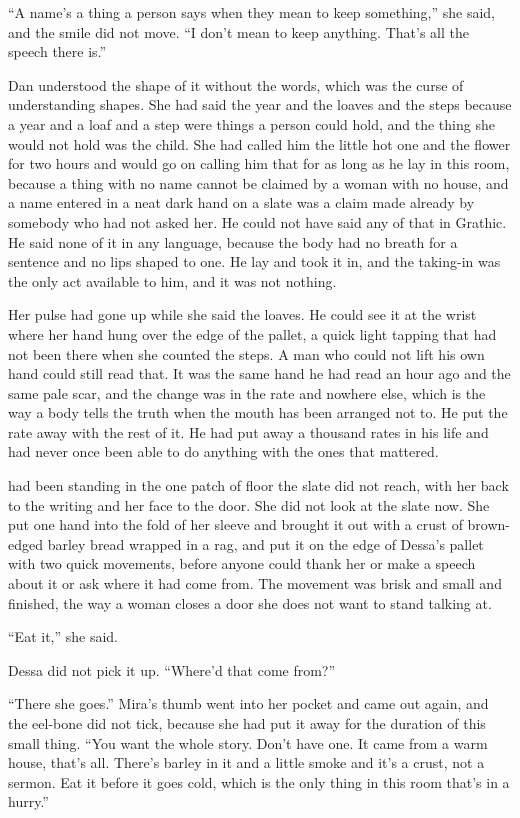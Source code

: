 “A name's a thing a person says when they mean to keep something,” she said, and the smile did not move. “I don't mean to keep anything. That's all the speech there is.”

Dan understood the shape of it without the words, which was the curse of understanding shapes. She had said the year and the loaves and the steps because a year and a loaf and a step were things a person could hold, and the thing she would not hold was the child. She had called him the little hot one and the flower for two hours and would go on calling him that for as long as he lay in this room, because a thing with no name cannot be claimed by a woman with no house, and a name entered in a neat dark hand on a slate was a claim made already by somebody who had not asked her. He could not have said any of that in Grathic. He said none of it in any language, because the body had no breath for a sentence and no lips shaped to one. He lay and took it in, and the taking-in was the only act available to him, and it was not nothing.

Her pulse had gone up while she said the loaves. He could see it at the wrist where her hand hung over the edge of the pallet, a quick light tapping that had not been there when she counted the steps. A man who could not lift his own hand could still read that. It was the same hand he had read an hour ago and the same pale scar, and the change was in the rate and nowhere else, which is the way a body tells the truth when the mouth has been arranged not to. He put the rate away with the rest of it. He had put away a thousand rates in his life and had never once been able to do anything with the ones that mattered.

 had been standing in the one patch of floor the slate did not reach, with her back to the writing and her face to the door. She did not look at the slate now. She put one hand into the fold of her sleeve and brought it out with a crust of brown-edged barley bread wrapped in a rag, and put it on the edge of Dessa's pallet with two quick movements, before anyone could thank her or make a speech about it or ask where it had come from. The movement was brisk and small and finished, the way a woman closes a door she does not want to stand talking at.

“Eat it,” she said.

Dessa did not pick it up. “Where'd that come from?”

“There she goes.” Mira's thumb went into her pocket and came out again, and the eel-bone did not tick, because she had put it away for the duration of this small thing. “You want the whole story. Don't have one. It came from a warm house, that's all. There's barley in it and a little smoke and it's a crust, not a sermon. Eat it before it goes cold, which is the only thing in this room that's in a hurry.”

